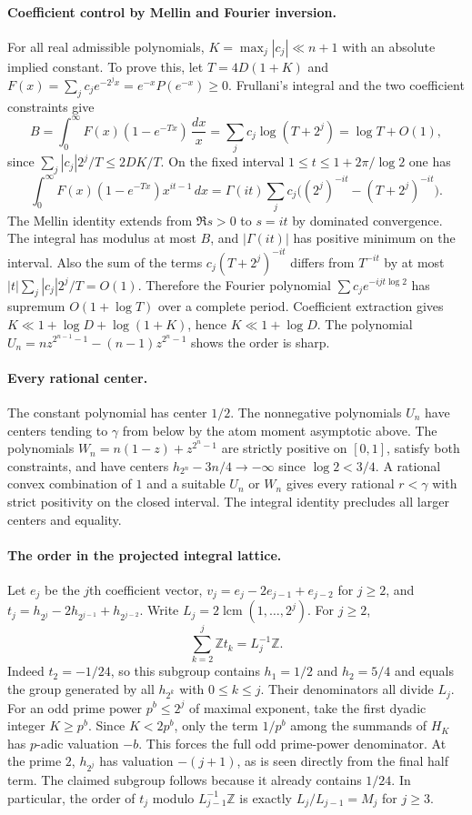 \documentclass[11pt,a4paper,oneside,openany]{report}
\theoremstyle{remark}\newtheorem{remark}[theorem]{Remark}
\numberwithin{equation}{section}
\begin{document}
\paragraph{Coefficient control by Mellin and Fourier inversion.}
For all real admissible polynomials, $K=\max_j|c_j|\ll n+1$ with an
absolute implied constant. To prove this, let $T=4D(1+K)$ and
$F(x)=\sum_j c_j e^{-2^j x}=e^{-x}P(e^{-x})\ge0$. Frullani's
integral and the two coefficient constraints give
\[
 B=\int_0^\infty F(x)(1-e^{-Tx})\,\frac{dx}{x}
   =\sum_j c_j\log(T+2^j)=\log T+O(1),
\]
since $\sum_j |c_j|2^j/T\le2DK/T$. On the fixed interval
$1\le t\le1+2\pi/\log2$ one has
\[
 \int_0^\infty F(x)(1-e^{-Tx})x^{it-1}\,dx
 =\Gamma(it)\sum_jc_j\big((2^j)^{-it}-(T+2^j)^{-it}\big).
\]
The Mellin identity extends from $\Re s>0$ to $s=it$ by dominated
convergence. The integral has modulus at most $B$, and $|\Gamma(it)|$
has positive minimum on the interval. Also the sum of the terms
$c_j(T+2^j)^{-it}$ differs from $T^{-it}$ by at most
$|t|\sum_j |c_j|2^j/T=O(1)$. Therefore the Fourier polynomial
$\sum c_j e^{-ijt\log2}$ has supremum $O(1+\log T)$ over a complete
period. Coefficient extraction gives $K\ll1+\log D+\log(1+K)$,
hence $K\ll1+\log D$. The polynomial
$U_n=nz^{2^{n-1}-1}-(n-1)z^{2^n-1}$ shows the order is sharp.

\paragraph{Every rational center.}
The constant polynomial has center $1/2$. The nonnegative polynomials
$U_n$ have centers tending to $\gamma$ from below by the atom moment
asymptotic above. The polynomials $W_n=n(1-z)+z^{2^n-1}$ are strictly
positive on $[0,1]$, satisfy both constraints, and have centers
$h_{2^n}-3n/4\to-\infty$ since $\log2<3/4$. A rational convex
combination of $1$ and a suitable $U_n$ or $W_n$ gives every rational
$r<\gamma$ with strict positivity on the closed interval. The integral
identity precludes all larger centers and equality.

\paragraph{The order in the projected integral lattice.}
Let $e_j$ be the $j$th coefficient vector, $v_j=e_j-2e_{j-1}+e_{j-2}$
for $j\ge2$, and $t_j=h_{2^j}-2h_{2^{j-1}}+h_{2^{j-2}}$.
Write $L_j=2\operatorname{lcm}(1,\ldots,2^j)$. For $j\ge2$,
\[
             \sum_{k=2}^j\mathbb Z t_k=L_j^{-1}\mathbb Z .
\]
Indeed $t_2=-1/24$, so this subgroup contains $h_1=1/2$ and
$h_2=5/4$ and equals the group generated by all $h_{2^k}$ with
$0\le k\le j$. Their denominators all divide $L_j$. For an odd prime
power $p^b\le2^j$ of maximal exponent, take the first dyadic integer
$K\ge p^b$. Since $K<2p^b$, only the term $1/p^b$ among the summands
of $H_K$ has $p$-adic valuation $-b$. This forces the full odd
prime-power denominator. At the prime $2$, $h_{2^j}$ has valuation
$-(j+1)$, as is seen directly from the final half term. The claimed
subgroup follows because it already contains $1/24$. In particular,
the order of $t_j$ modulo $L_{j-1}^{-1}\mathbb Z$ is exactly
$L_j/L_{j-1}=M_j$ for $j\ge3$.
\end{document}
